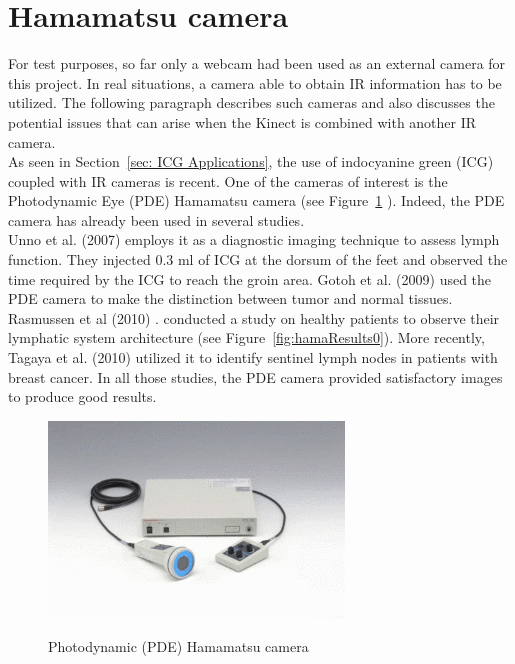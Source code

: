 \section{Hamamatsu camera}
\label{sec:Hamamatsu camera}

For test purposes, so far only a webcam had been used as an external camera for this project. In real situations, a camera able to obtain IR information has to be utilized. The following paragraph describes such cameras and also discusses the potential issues that can arise when the Kinect is combined with another IR camera.\\

As seen in Section~\ref{sec: ICG Applications}, the use of indocyanine green (ICG) coupled with IR cameras is recent. One of the cameras of interest is the Photodynamic Eye (PDE) Hamamatsu camera (see Figure~\ref{fig:hamamatsu} \cite{pde}). Indeed, the PDE camera has already been used in several studies. \\

Unno et al. (2007) \cite{unno_quantitative_2008} employs it as a diagnostic imaging technique to assess lymph function. They injected 0.3 ml of ICG at the dorsum of the feet and observed the time required by the ICG to reach the groin area. Gotoh et al. (2009) \cite{gotoh_novel_2009} used the PDE camera to make the distinction between tumor and normal tissues. Rasmussen et al (2010) \cite{rasmussen_lymphatic_2009}. conducted a study on healthy patients to observe their lymphatic system architecture (see Figure~\ref{fig:hamaResults0}). More recently, Tagaya et al. (2010) \cite{tagaya_non-invasive_2010} utilized it to identify sentinel lymph nodes in patients with breast cancer. In all those studies, the PDE camera provided satisfactory images to produce good results.\\

\begin{figure}
\caption{Photodynamic (PDE) Hamamatsu camera}
\centering
    \includegraphics[width=0.7\textwidth]{images/hamamatsu.jpg}
\label{fig:hamamatsu}
\end{figure}

